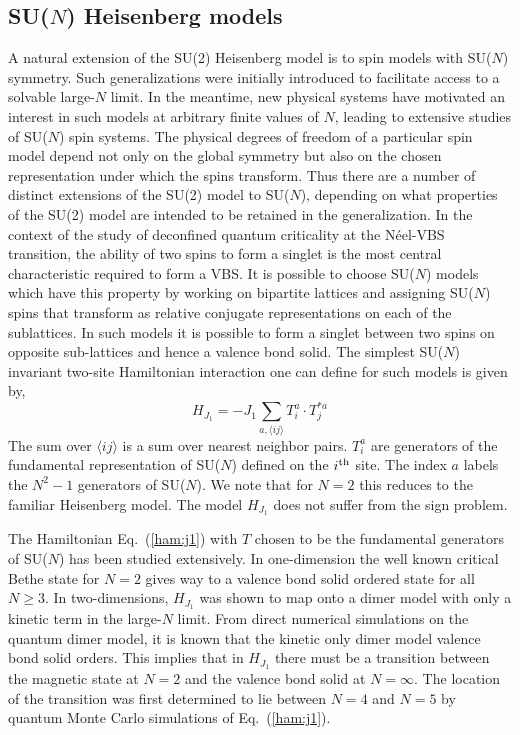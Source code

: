 \documentclass[range]{ar2e}
\begin{document}
\subsection{SU($N$) Heisenberg models}
\label{ss:j1N}
A natural extension of the SU(2) Heisenberg model is to spin models with
SU($N$) symmetry. Such generalizations were initially introduced to
facilitate access to
a solvable large-$N$ limit. In the meantime, new physical systems have
motivated an interest in such models at arbitrary finite values of
$N$, leading to extensive studies of SU($N$) spin systems. The physical degrees of freedom of a particular
spin model depend not only on the global symmetry but also on the
chosen representation under which the spins transform. Thus there are
a number of distinct extensions of the SU(2) model to SU($N$), depending on
what properties of the SU(2) model are intended to be retained in the
generalization. In the context of the study of deconfined quantum criticality at the
N\'eel-VBS transition, the ability of two spins to form a singlet is the most
central characteristic required to form a VBS. It
is possible to choose SU($N$) models which have this property by
working on bipartite lattices and
assigning SU($N$) spins that transform
as relative conjugate representations
 on each of the sublattices. In such models it is possible to form a singlet
between two spins on opposite sub-lattices and hence a valence bond
solid.  The simplest SU($N$) invariant two-site Hamiltonian interaction one can define for
such models is given by,
\begin{equation}
\label{ham:j1}
H_{J_1} = -J_1 \sum_{a,\langle ij\rangle} T^a_i\cdot T^{*a}_j
\end{equation}
The sum over $\langle ij \rangle$ is a sum over nearest neighbor
pairs. $T^a_i$ are generators of the fundamental representation of SU($N$) defined on the
$i^{\rm th}$ site. The index $a$ labels the $N^2-1$ generators of
SU($N$). We note that for $N=2$ this reduces to the familiar
Heisenberg model. The model $H_{J_1}$ does not suffer from the sign
problem.

The Hamiltonian Eq.~(\ref{ham:j1}) with $T$ chosen to be the
fundamental generators of SU($N$) has been studied extensively. In
one-dimension the well known critical Bethe state for $N=2$ gives way to a valence bond solid
ordered state for all $N\geq 3$.   In two-dimensions, $H_{J_1}$ was shown to map onto a dimer model
with only a kinetic term
in the large-$N$ limit. From direct numerical simulations
on the quantum dimer model, it is known that the kinetic only dimer model
valence bond solid orders.  This implies that in $H_{J_1}$ there must be a transition
between the magnetic state at $N=2$ and the valence bond solid at
$N=\infty$.  The location of the transition was first
determined to lie between $N=4$ and $N=5$ by quantum Monte Carlo
simulations of Eq.~(\ref{ham:j1}).
\end{document}
